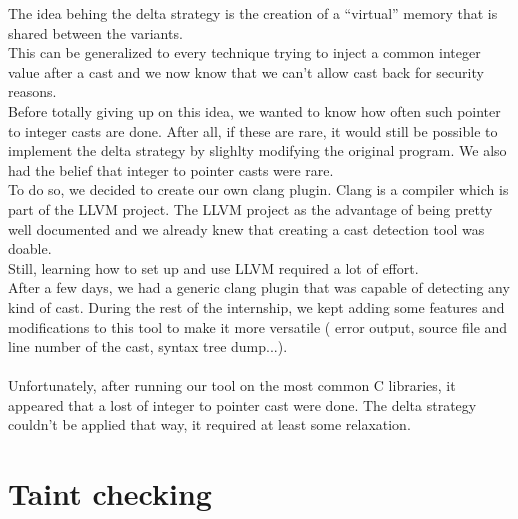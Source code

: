 \documentclass[english]{enstaPRE}
\begin{document}
The idea behing the delta strategy is the creation of a ``virtual'' memory that is shared between the variants. \\
This can be generalized to every technique trying to inject a common integer value after a cast and we now know that we can't allow
cast back for security reasons. \\ Before totally giving up on this idea, we wanted to know how often such pointer to integer casts are
done. After all, if these are rare, it would still be possible to implement the delta strategy by slighlty modifying the original 
program. We also had the belief that integer to pointer casts were rare.\\ 
To do so, we decided to create our own clang plugin. Clang is a compiler which is part of the LLVM project. The LLVM project as 
the advantage of being pretty well documented and we already knew that creating a cast detection tool was doable. \\
Still, learning how to set up and use LLVM required a lot of effort. \\
After a few days, we had a generic clang plugin that was capable of detecting any kind of cast. During the rest of the internship,
we kept adding some features and modifications to this tool to make it more versatile ( error output, source file and line number of 
the cast, syntax tree dump...). \\ \\
Unfortunately, after running our tool on the most common C libraries, it appeared that a lost of integer to pointer cast were done.
The delta strategy couldn't be applied that way, it required at least some relaxation.

\section{Taint checking}
\end{document}
